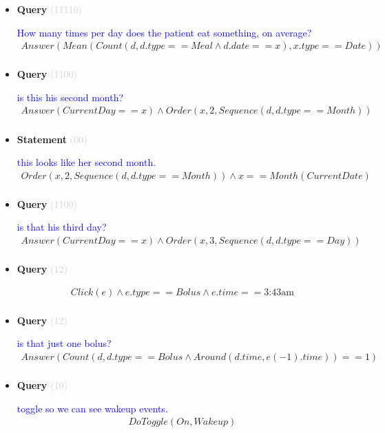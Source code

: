 \documentclass[11pt]{article}
\newcommand{\key}[1]{\textcolor{lightgray}{#1}}
\newcounter{CQuery}
\newcounter{CStatement}
\begin{document}
\begin{itemize}
\item
\textbf{Query\theCQuery} \key{(11110)} \addtocounter{CQuery}{1}
\textcolor{blue}{ How many times per day does the patient eat something, on average? }
\begin{multline*}
Answer(Mean(Count(d, d.type==Meal \wedge d.date==x), x.type==Date)) \\ 
\end{multline*}


\item
\textbf{Query\theCQuery} \key{(1100)} \addtocounter{CQuery}{1}
\textcolor{blue}{ is this his second month? }
\begin{multline*}
Answer(CurrentDay==x) \wedge Order(x, 2, Sequence(d, d.type==Month)) \\ 
\end{multline*}


\item
\textbf{Statement\theCStatement} \key{(00)} \addtocounter{CStatement}{1}
\textcolor{blue}{ this looks like her second month. }
\begin{multline*}
Order(x, 2, Sequence(d, d.type==Month)) \wedge x==Month(CurrentDate) \\ 
\end{multline*}


\item
\textbf{Query\theCQuery} \key{(1100)} \addtocounter{CQuery}{1}
\textcolor{blue}{ is that his third day? }
\begin{multline*}
Answer(CurrentDay==x) \wedge Order(x, 3, Sequence(d, d.type==Day)) \\ 
\end{multline*}


\item
\textbf{Query\theCQuery} \key{(12)} \addtocounter{CQuery}{1}
\textcolor{blue}{  }
\begin{multline*}
Click(e) \wedge e.type == Bolus \wedge e.time==\mbox{3:43am} \\ 
\end{multline*}


\item
\textbf{Query\theCQuery} \key{(12)} \addtocounter{CQuery}{1}
\textcolor{blue}{ is that just one bolus? }
\begin{multline*}
Answer(Count(d, d.type==Bolus \wedge Around(d.time, e(-1).time))==1) \\ 
\end{multline*}


\item
\textbf{Query\theCQuery} \key{(10)} \addtocounter{CQuery}{1}
\textcolor{blue}{ toggle so we can see wakeup events. }
\begin{multline*}
DoToggle(On, Wakeup) \\ 
\end{multline*}



\end{itemize}
\end{document}
